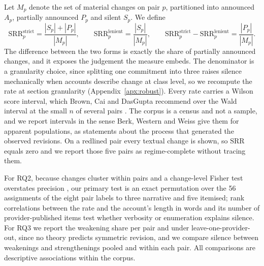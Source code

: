 \documentclass{article}
\newcommand{\srr}{\mathrm{SRR}}
\begin{document}
Let $M_p$ denote the set of material changes on pair $p$, partitioned into announced $A_p$, partially announced $P_p$ and silent $S_p$. We define
\begin{equation}
\srr^{\mathrm{strict}}_p = \frac{|S_p| + |P_p|}{|M_p|}, \qquad
\srr^{\mathrm{lenient}}_p = \frac{|S_p|}{|M_p|}, \qquad
\srr^{\mathrm{strict}}_p - \srr^{\mathrm{lenient}}_p = \frac{|P_p|}{|M_p|} .
\label{eq:srr}
\end{equation}
The difference between the two forms is exactly the share of partially announced changes, and it exposes the judgement the measure embeds. The denominator is a granularity choice, since splitting one commitment into three raises silence mechanically when accounts describe change at class level, so we recompute the rate at section granularity (Appendix~\ref{apx:robust}). Every rate carries a Wilson score interval, which Brown, Cai and DasGupta \citep{brown2001interval} recommend over the Wald interval at the small $n$ of several pairs \citep{wilson1927probable}. The corpus is a census and not a sample, and we report intervals in the sense Berk, Western and Weiss \citep{berk1995statistical} give them for apparent populations, as statements about the process that generated the observed revisions. On a redlined pair every textual change is shown, so $\srr$ equals zero and we report those five pairs as regime-complete without tracing them.

For RQ2, because changes cluster within pairs and a change-level Fisher test overstates precision \citep{cameron2015practitioner}, our primary test is an exact permutation over the 56 assignments of the eight pair labels to three narrative and five itemised; rank correlations between the rate and the account's length in words and its number of provider-published items test whether verbosity or enumeration explains silence. For RQ3 we report the weakening share per pair and under leave-one-provider-out, since no theory predicts symmetric revision, and we compare silence between weakenings and strengthenings pooled and within each pair. All comparisons are descriptive associations within the corpus.
\end{document}

